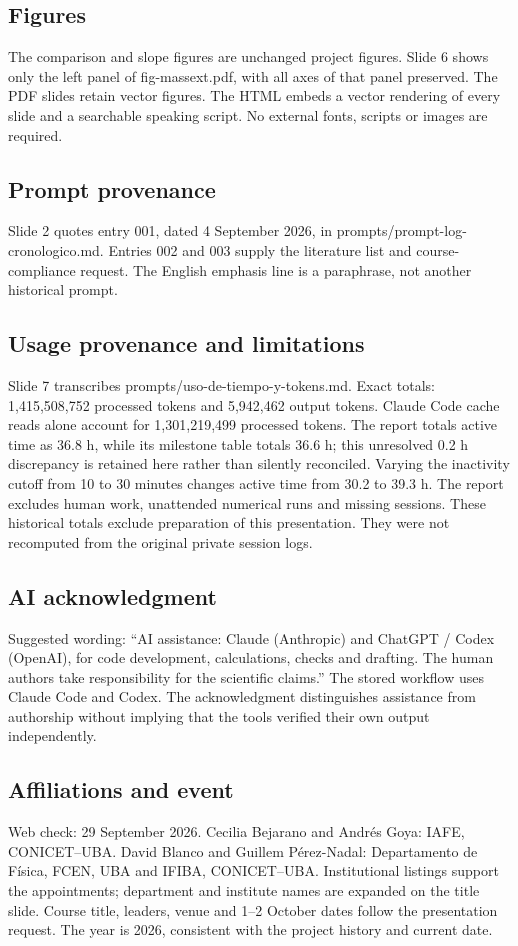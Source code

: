 \documentclass[12pt,a4paper]{article}
\begin{document}
\subsection*{Figures}
The comparison and slope figures are unchanged project figures. Slide 6 shows only the left panel of fig-massext.pdf, with all axes of that panel preserved. The PDF slides retain vector figures. The HTML embeds a vector rendering of every slide and a searchable speaking script. No external fonts, scripts or images are required.
\subsection*{Prompt provenance}
Slide 2 quotes entry 001, dated 4 September 2026, in prompts/prompt-log-cronologico.md. Entries 002 and 003 supply the literature list and course-compliance request. The English emphasis line is a paraphrase, not another historical prompt.
\subsection*{Usage provenance and limitations}
Slide 7 transcribes prompts/uso-de-tiempo-y-tokens.md. Exact totals: 1,415,508,752 processed tokens and 5,942,462 output tokens. Claude Code cache reads alone account for 1,301,219,499 processed tokens. The report totals active time as 36.8 h, while its milestone table totals 36.6 h; this unresolved 0.2 h discrepancy is retained here rather than silently reconciled. Varying the inactivity cutoff from 10 to 30 minutes changes active time from 30.2 to 39.3 h. The report excludes human work, unattended numerical runs and missing sessions. These historical totals exclude preparation of this presentation. They were not recomputed from the original private session logs.
\newpage
\subsection*{AI acknowledgment}
Suggested wording: “AI assistance: Claude (Anthropic) and ChatGPT / Codex (OpenAI), for code development, calculations, checks and drafting. The human authors take responsibility for the scientific claims.” The stored workflow uses Claude Code and Codex. The acknowledgment distinguishes assistance from authorship without implying that the tools verified their own output independently.
\subsection*{Affiliations and event}
Web check: 29 September 2026. Cecilia Bejarano and Andrés Goya: IAFE, CONICET--UBA. David Blanco and Guillem Pérez-Nadal: Departamento de Física, FCEN, UBA and IFIBA, CONICET--UBA. Institutional listings support the appointments; department and institute names are expanded on the title slide. Course title, leaders, venue and 1--2 October dates follow the presentation request. The year is 2026, consistent with the project history and current date.
\end{document}
